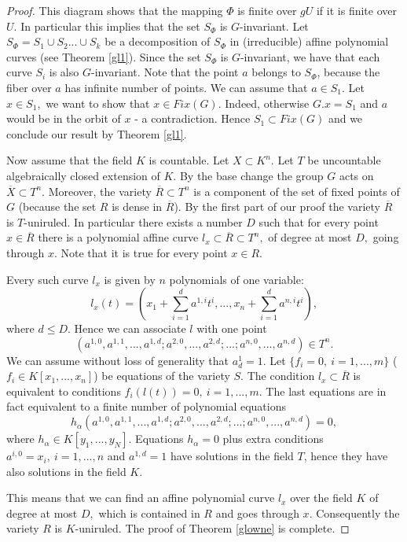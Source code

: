 \documentclass{amsproc}
\begin{document}
\begin{proof}
\noindent This diagram shows that the mapping $\Phi$ is finite
over $gU$ if it is finite over $U.$ In particular this implies
that the set $S_\Phi$ is $G$-invariant. Let  $S_\Phi=S_1\cup
S_2...\cup S_k$ be a decomposition of $S_\Phi$ in (irreducible)
affine polynomial curves (see Theorem \ref{gl1}). Since the set
$S_\Phi$ is $G$-invariant, we have that each curve $S_i$ is also
$G$-invariant. Note that the point $a$ belongs to $S_\Phi$,
because the fiber over $a$ has infinite number of points. We can
assume that $a\in S_1.$ Let $x\in S_1,$ we want to show that $x\in
Fix(G).$ Indeed, otherwise $G.x=S_1$ and $a$ would be in the orbit
of $x$ - a contradiction. Hence $S_1\subset Fix(G)$ and we
conclude our result by Theorem \ref{gl1}.

Now assume that the field $K$ is countable. Let $X\subset K^n.$
Let $T$ be uncountable algebraically closed extension of $K.$ By
the base change the group $G$ acts on $\overline{X}\subset T^n.$
Moreover, the variety $\overline{R}\subset T^n$ is a component of
the set of fixed points of $G$ (because the set $R$ is dense in
$\overline{R}$). By the first part of our proof the variety
$\overline{R}$ is $T$-uniruled. In particular there exists a
number $D$  such that for every point $x\in \overline{R}$ there is
a polynomial affine curve $l_x\subset \overline{R}\subset T^n,$ of
degree at most $D,$ going through $x$.
  Note that it is true for every point  $x\in R.$

Every such curve  $l_x$ is given by $n$ polynomials of one
variable: $$l_x(t)=(x_1+\sum_{i=1}^d a^{1,i}
t^i,...,x_n+\sum_{i=1}^d a^{n,i} t^i),$$ where $d\le D.$ Hence we
can associate $l$ with one point
$$(a^{1,0},a^{1,1},...,a^{1,d};a^{2,0},...,a^{2,d};...;a^{n,0},...,a^{n,d})\in
T^n.$$ We can assume without loss of generality that $a^1_d=1.$
Let $\{f_i=0, \ i=1,...,m\}$ ($f_i\in K[x_1,...,x_n]$) be
equations of the variety $S.$ The condition $l_x\subset
\overline{R}$ is equivalent to conditions $f_i(l(t))=0, \ i
=1,..., m.$ The last equations are in fact equivalent to a finite
number of polynomial equations
$$h_\alpha(a^{1,0},a^{1,1},...,a^{1,d};a^{2,0},...,a^{2,d};...;a^{n,0},...,a^{n,d})=0,$$
where $h_\alpha \in K[y_1,...,y_N].$ Equations $h_\alpha=0$ plus
extra conditions $a^{i,0}=x_i, \ i =1,...,n$ and $a^{1,d}=1$ have
solutions in the field $T$, hence they have also  solutions in the
field $K.$

  This means that we can find an affine polynomial
curve $l_x$ over the field $K$ of degree at most $D,$ which  is
contained in $R$ and goes through $x.$  Consequently the variety
$R$ is $K$-uniruled. The proof of Theorem \ref{glowne} is
complete.\end{proof}
\end{document}
